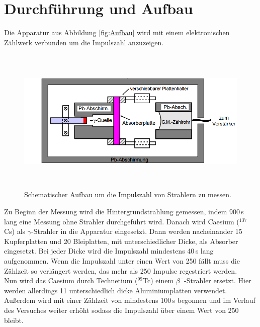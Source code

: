 \newpage
\section{Durchführung und Aufbau}
\label{sec:Durchführung}
Die Apparatur aus Abbildung \eqref{fig:Aufbau} wird mit einem elektronischen Zählwerk verbunden um die Impulszahl anzuzeigen. \\

\begin{figure}[H]
  \centering
  \includegraphics[height=7cm]{picture/Aufbau.PNG}
  \caption{Schematischer Aufbau um die Impulszahl von Strahlern zu messen. \cite[14]{sample}}
  \label{fig:Aufbau}
\end{figure}

Zu Beginn der Messung wird die Hintergrundstrahlung gemessen, indem 900\,s lang eine Messung ohne Strahler durchgeführt wird. Danach wird Caesium ($^{137}$Cs) als $\gamma$-Strahler in die Apparatur eingesetzt. Dann werden nacheinander 15 Kupferplatten und 20 Bleiplatten, mit unterschiedlicher Dicke, als Absorber eingesetzt. Bei jeder Dicke wird die Impulszahl mindestens 40\,s lang aufgenommen. Wenn die Impulszahl unter einen Wert von 250 fällt muss die Zählzeit so verlängert werden, das mehr als 250 Impulse regestriert werden. \\
Nun wird das Caesium durch Technetium ($^{99}$Tc) einem $\beta^-$-Strahler ersetzt. Hier werden allerdings 11 unterschiedlich dicke Aluminiumplatten verwendet. Außerdem wird mit einer Zählzeit von mindestens 100\,s begonnen und im Verlauf des Versuches weiter erhöht sodass die Impulszahl über einem Wert von 250 bleibt.
